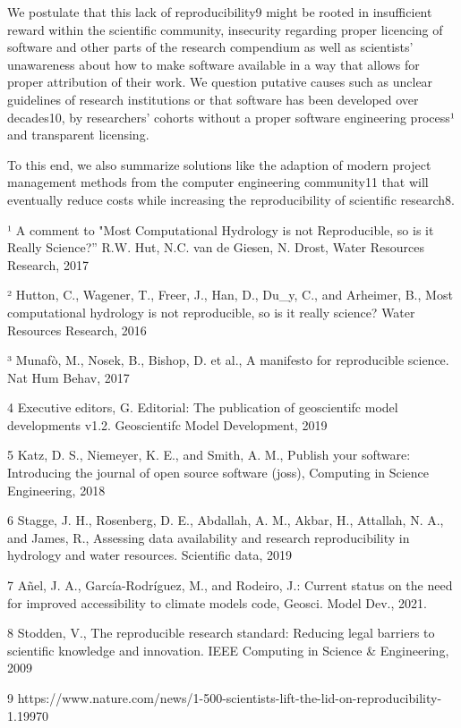 \documentclass{article}
\begin{document}
We postulate that this lack of reproducibility9 might be rooted in insufficient reward within the scientific community, insecurity regarding proper licencing of software and other parts of the research compendium as well as scientists’ unawareness about how to make software available in a way that allows for proper attribution of their work. We question putative causes such as unclear guidelines of research institutions or that software has been developed over decades10, by researchers' cohorts without a proper software engineering process¹ and transparent licensing.

To this end, we also summarize solutions like the adaption of modern project management methods from the computer engineering community11 that will eventually reduce costs while increasing the reproducibility of scientific research8.

¹ A comment to "Most Computational Hydrology is not Reproducible, so is it Really Science?” R.W. Hut, N.C. van de Giesen, N. Drost, Water Resources Research, 2017

² Hutton, C., Wagener, T., Freer, J., Han, D., Du\_y, C., and Arheimer, B., Most computational hydrology is not reproducible, so is it really science? Water Resources Research, 2016

³ Munafò, M., Nosek, B., Bishop, D. et al., A manifesto for reproducible science. Nat Hum Behav, 2017

4 Executive editors, G. Editorial: The publication of geoscientifc model developments v1.2. Geoscientifc Model Development, 2019

5 Katz, D. S., Niemeyer, K. E., and Smith, A. M., Publish your software: Introducing the journal of open source software (joss), Computing in Science Engineering, 2018

6 Stagge, J. H., Rosenberg, D. E., Abdallah, A. M., Akbar, H., Attallah, N. A., and James, R., Assessing data availability and research reproducibility in hydrology and water resources. Scientific data, 2019

7 Añel, J. A., García-Rodríguez, M., and Rodeiro, J.: Current status on the need for improved accessibility to climate models code, Geosci. Model Dev., 2021.

8 Stodden, V., The reproducible research standard: Reducing legal barriers to scientific knowledge and innovation. IEEE Computing in Science \& Engineering, 2009

9 https://www.nature.com/news/1-500-scientists-lift-the-lid-on-reproducibility-1.19970
\end{document}
